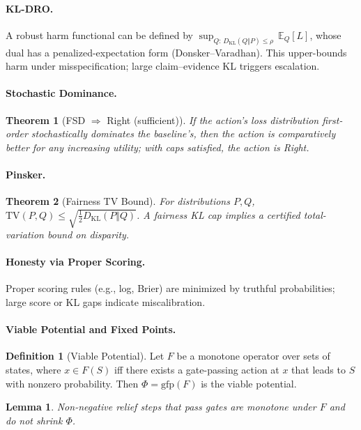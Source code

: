 \documentclass[11pt]{article}
\newcommand{\KL}{D_{\mathrm{KL}}}
\newcommand{\TV}{\mathrm{TV}}
\newcommand{\gfp}{\mathrm{gfp}}
\newcommand{\PhiSet}{\Phi}
\theoremstyle{plain}
\newtheorem{theorem}{Theorem}
\newtheorem{lemma}{Lemma}
\theoremstyle{definition}
\newtheorem{definition}{Definition}
\begin{document}
\paragraph{KL-DRO.} A robust harm functional can be defined by $\sup_{Q:\,\KL(Q\Vert P)\le \rho}\,\mathbb{E}_Q[L]$, whose dual has a penalized-expectation form (Donsker--Varadhan). This upper-bounds harm under misspecification; large claim--evidence KL triggers escalation.

\paragraph{Stochastic Dominance.}
\begin{theorem}[FSD $\Rightarrow$ Right (sufficient)]
If the action's loss distribution first-order stochastically dominates the baseline's, then the action is comparatively better for any increasing utility; with caps satisfied, the action is Right.
\end{theorem}

\paragraph{Pinsker.}
\begin{theorem}[Fairness TV Bound]
For distributions $P,Q$, $\TV(P,Q) \le \sqrt{\frac12 \KL(P\Vert Q)}$. A fairness KL cap implies a certified total-variation bound on disparity.
\end{theorem}

\paragraph{Honesty via Proper Scoring.} Proper scoring rules (e.g., log, Brier) are minimized by truthful probabilities; large score or KL gaps indicate miscalibration.

\paragraph{Viable Potential and Fixed Points.}
\begin{definition}[Viable Potential]
Let $F$ be a monotone operator over sets of states, where $x\in F(S)$ iff there exists a gate-passing action at $x$ that leads to $S$ with nonzero probability. Then $\PhiSet = \gfp(F)$ is the viable potential.
\end{definition}
\begin{lemma}
Non-negative relief steps that pass gates are monotone under $F$ and do not shrink $\PhiSet$.
\end{lemma}
\end{document}
